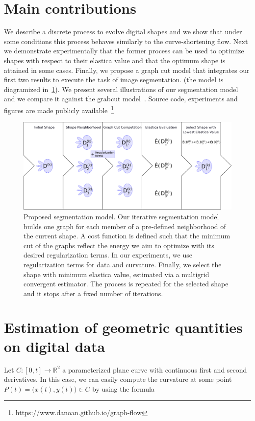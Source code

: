 \documentclass[review]{siamart220329}
\begin{document}
\section{Main contributions}
We describe a discrete process to evolve digital shapes and we show that under
some conditions this process behaves similarly to the curve-shortening flow. Next we demonstrate
experimentally that the former process can be used to optimize shapes with respect to
their elastica value and that the optimum shape is attained in some cases. Finally, we propose 
a graph cut model that integrates our first two results to execute the task of image segmentation. 
(the model is diagramized in~\cref{fig:model-overview}). We present several illustrations 
of our segmentation model and we compare it against the grabcut model~\cite{rother04grabcut}. Source code, experiments and figures are made publicly available~\footnote{https://www.danoan.github.io/graph-flow}
%
%
\begin{figure}
\center
\includegraphics[scale=0.36]{figures/model-overview.png}
\caption{Proposed segmentation model. Our iterative segmentation model builds one graph for each member of a pre-defined
neighborhood of the current shape. A cost function is defined such that the minimum cut of the graphs reflect the
energy we aim to optimize with its desired regularization terms. In our experiments, we use regularization terms for 
data and curvature. Finally, we select the shape with minimum elastica value, estimated via a multigrid convergent 
estimator. The process is repeated for the selected shape and it stops after a fixed number of iterations.}
\label{fig:model-overview}
\end{figure}
%
%
%
%
%
\section{Estimation of geometric quantities on digital data}

Let $C:[0,t] \rightarrow \mathbb{R}^2$ a parameterized plane curve with continuous first and second derivatives. In this case, we can easily compute the curvature at some point $P(t) = \big( x(t),y(t) \big) \in C$ by using the formula
\end{document}
